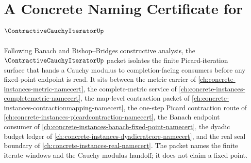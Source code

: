 \chapter{A Concrete Naming Certificate for $\ContractiveCauchyIteratorUp$}
\label{ch:concrete-instances-contractive-cauchy-iterator-namecert}

Following Banach and Bishop--Bridges constructive analysis, the $\ContractiveCauchyIteratorUp$ packet isolates the finite Picard-iteration surface that hands a Cauchy modulus to completion-facing consumers before any fixed-point endpoint is read. It sits between the metric carrier of \autoref{ch:concrete-instances-metric-namecert}, the complete-metric service of \autoref{ch:concrete-instances-completemetric-namecert}, the map-level contraction packet of \autoref{ch:concrete-instances-contractionmapping-namecert}, the one-step Picard contraction route of \autoref{ch:concrete-instances-picardcontraction-namecert}, the Banach endpoint consumer of \autoref{ch:concrete-instances-banach-fixed-point-namecert}, the dyadic budget ledger of \autoref{ch:concrete-instances-dyadicratcore-namecert}, and the real seal boundary of \autoref{ch:concrete-instances-real-namecert}. The packet names the finite iterate windows and the Cauchy-modulus handoff; it does not claim a fixed point.

